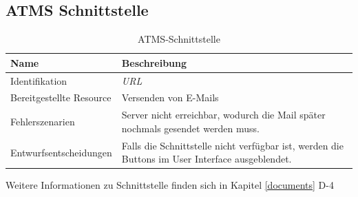 \subsection{ATMS Schnittstelle}

\begin{table}[H]
	\centering
	\caption{ATMS-Schnittstelle}
	\begin{tabular}{ | p{4cm} | p{11cm} | }
		\toprule
		{\textbf{Name}} & {\textbf{Beschreibung}} \\
		\midrule
		Identifikation & \textit{\gls{URL}} \\ \hline
		Bereitgestellte Resource & Versenden von E-Mails\\ \hline
		Fehlerszenarien & Server nicht erreichbar, wodurch die Mail später nochmals gesendet werden muss.\\ \hline
		Entwurfsentscheidungen & \color {red} {Falls die Schnittstelle nicht verfügbar ist, werden die Buttons im User Interface ausgeblendet.}\\
		\bottomrule
	\end{tabular}
\end{table}

Weitere Informationen zu Schnittstelle finden sich in Kapitel \ref{documents} D-4
